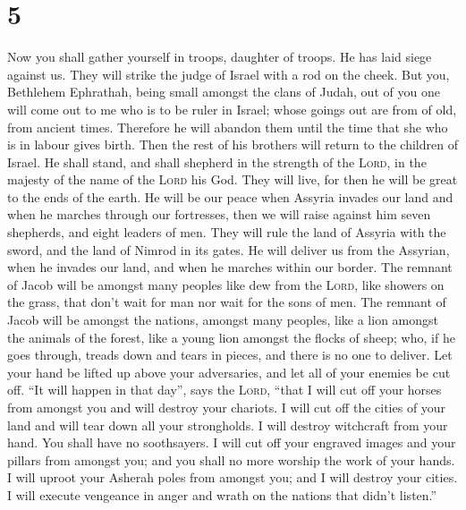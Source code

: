 \hypertarget{section-4}{%
\section{5}\label{section-4}}

 Now you shall gather yourself in troops, daughter of
troops. He has laid siege against us. They will strike the judge of
Israel with a rod on the cheek.  But you, Bethlehem
Ephrathah, being small amongst the clans of Judah, out of you one will
come out to me who is to be ruler in Israel; whose goings out are from
of old, from ancient times.  Therefore he will abandon
them until the time that she who is in labour gives birth. Then the rest
of his brothers will return to the children of Israel.  He
shall stand, and shall shepherd in the strength of the \textsc{Lord}, in
the majesty of the name of the \textsc{Lord} his God. They will live,
for then he will be great to the ends of the earth.  He
will be our peace when Assyria invades our land and when he marches
through our fortresses, then we will raise against him seven shepherds,
and eight leaders of men.  They will rule the land of
Assyria with the sword, and the land of Nimrod in its gates. He will
deliver us from the Assyrian, when he invades our land, and when he
marches within our border.  The remnant of Jacob will be
amongst many peoples like dew from the \textsc{Lord}, like showers on
the grass, that don't wait for man nor wait for the sons of men.
 The remnant of Jacob will be amongst the nations, amongst
many peoples, like a lion amongst the animals of the forest, like a
young lion amongst the flocks of sheep; who, if he goes through, treads
down and tears in pieces, and there is no one to deliver. 
Let your hand be lifted up above your adversaries, and let all of your
enemies be cut off.  ``It will happen in that day'', says
the \textsc{Lord}, ``that I will cut off your horses from amongst you
and will destroy your chariots.  I will cut off the
cities of your land and will tear down all your strongholds.
 I will destroy witchcraft from your hand. You shall have
no soothsayers.  I will cut off your engraved images and
your pillars from amongst you; and you shall no more worship the work of
your hands.  I will uproot your Asherah poles from
amongst you; and I will destroy your cities.  I will
execute vengeance in anger and wrath on the nations that didn't
listen.''

